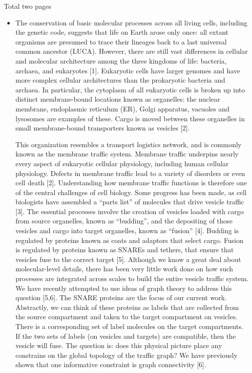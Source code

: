 Total two pages

\begin{itemize}
\item {}

The conservation of basic molecular processes across all living cells, including the genetic code, suggests that life on Earth arose only once: all extant organisms are presumed to trace their lineages back to a last universal common ancestor (LUCA). However, there are still vast differences in cellular and molecular architecture among the three kingdoms of life: bacteria, archaea, and eukaryotes [1]. Eukaryotic cells have larger genomes and have more complex cellular architectures than the prokaryotic bacteria and archaea. In particular, the cytoplasm of all eukaryotic cells is broken up into distinct membrane-bound locations known as organelles: the nuclear membrane, endoplasmic reticulum (ER), Golgi apparatus, vacuoles and lysosomes are examples of these. Cargo is moved between these organelles in small membrane-bound transporters known as vesicles [2].

This organization resembles a transport logistics network, and is commonly known as the membrane traffic system. Membrane traffic underpins nearly every aspect of eukaryotic cellular physiology, including human cellular physiology. Defects in membrane traffic lead to a variety of disorders or even cell death [2]. Understanding how membrane traffic functions is therefore one of the central challenges of cell biology. Some progress has been made, as cell biologists have assembled a “parts list” of molecules that drive vesicle traffic [3]. The essential processes involve the creation of vesicles loaded with cargo from source organelles, known as “budding”, and the depositing of those vesicles and cargo into target organelles, known as “fusion” [4]. Budding is regulated by proteins known as coats and adaptors that select cargo. Fusion is regulated by proteins known as SNAREs and tethers, that ensure that vesicles fuse to the correct target [5]. Although we know a great deal about molecular-level details, there has been very little work done on how such processes are integrated across scales to build the entire vesicle traffic system. We have recently attempted to use ideas of graph theory to address this question [5,6]. The SNARE proteins are the focus of our current work. Abstractly, we can think of these proteins as labels that are collected from the source compartment and taken to the target compartment on vesicles. There is a corresponding set of label molecules on the target compartments. If the two sets of labels (on vesicles and targets) are compatible, then the vesicle will fuse. The question is: does this physical picture place any constrains on the global topology of the traffic graph? We have previously shown that one informative constraint is graph connectivity [6].



\end{itemize}

